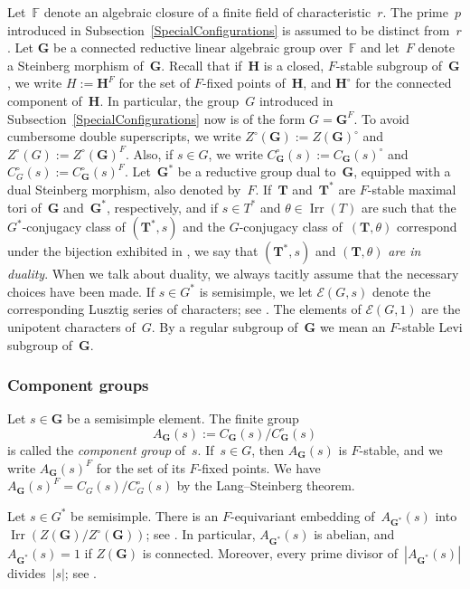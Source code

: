 \documentclass[12pt]{amsart}
\newcommand{\bG}{{\mathbf{G}}}      %
\newcommand{\bT}{{\mathbf{T}}}
\DeclareMathOperator{\Irr}{Irr}
\theoremstyle{theorem}
\theoremstyle{definition}
\theoremstyle{remark}
\begin{document}
Let~$\mathbb{F}$ denote an algebraic closure of a finite field of 
characteristic~$r$. The prime~$p$ introduced in 
Subsection~\ref{SpecialConfigurations} is assumed to be distinct from~$r$.
Let $\mathbf{G}$ be a connected reductive linear algebraic group 
over~$\mathbb{F}$ and 
let~$F$ denote a Steinberg morphism of~$\mathbf{G}$. Recall that if~$\mathbf{H}$ 
is a closed, $F$-stable subgroup of~$\mathbf{G}$, we write $H := \mathbf{H}^F$ 
for the set of $F$-fixed points of~$\mathbf{H}$, and $\mathbf{H}^\circ$ for the 
connected component of~$\mathbf{H}$. In particular, the group~$G$ introduced in
Subsection~\ref{SpecialConfigurations} now is of the form $G = \bG^F$. To avoid 
cumbersome double superscripts, we write 
$Z^{\circ}( \bG ) := Z( \bG )^{\circ}$ and $Z^{\circ}( G ) := 
Z^{\circ}( \bG )^F$. Also, if $s \in G$, we write $C^{\circ}_{\bG}( s ) :=
C_{\bG}( s )^{\circ}$ and $C^{\circ}_{G}( s ) := C^{\circ}_{\bG}( s )^F$.
Let~$\bG^*$ be a reductive group dual to~$\bG$, equipped with a dual Steinberg
morphism, also denoted by~$F$. If~$\bT$ and~$\bT^*$ are $F$-stable maximal tori 
of~$\bG$ and~$\bG^*$, respectively, and if $s \in T^*$ and $\theta \in \Irr(T)$
are such that the $G^*$-conjugacy class of $(\bT^*,s)$ and the $G$-conjugacy 
class of~$(\bT,\theta)$ correspond under the bijection exhibited in 
\cite[Proposition~$11.1.16$]{DiMi2}, we say that $(\bT^*, s)$ and 
$(\bT,\theta)$ \textit{are in duality}. When we talk about duality, we always 
tacitly assume that the necessary choices have been made. If $s \in G^*$ is 
semisimple, we let $\mathcal{E}( G, s )$ denote the corresponding Lusztig series 
of characters; see \cite[Definition~$2.6.1$]{GeMa}. 
The elements of $\mathcal{E}(G,1)$ are the unipotent characters of~$G$.
By a regular subgroup of~$\bG$ we mean an $F$-stable Levi subgroup of~$\bG$.

\subsubsection{Component groups}
\label{ComponentGroups}
Let $s \in \bG$ be a semisimple element. The finite group 
$$A_{\bG}( s ) := C_{\bG}(s)/C^{\circ}_{\bG}( s )$$
is called the \textit{component group} of~$s$. If~$s \in G$, then $A_{\bG}( s )$ 
is $F$-stable, and we write $A_{\bG}( s )^F$ for the set of its $F$-fixed 
points.  We have $A_{\bG}( s )^F = C_G( s )/C^{\circ}_G( s )$ by the 
Lang--Steinberg theorem. 

Let $s \in G^*$ be semisimple. There is an $F$-equivariant embedding 
of~$A_{\bG^*}( s )$ into $\Irr( Z( \bG )/Z^{\circ}( \bG ) )$; see \cite[$(8.4)$ 
and Lemme~$4.10$]{CeBo2}. In particular, $A_{\bG^*}( s )$ is abelian, and 
$A_{\bG^*}( s ) = 1$ if $Z( \bG )$ is connected. Moreover, every prime divisor 
of~$|A_{\bG^*}( s )|$ divides~$|s|$; see \cite[Lem\-ma~$8.3$]{CeBo2}.
\end{document}
